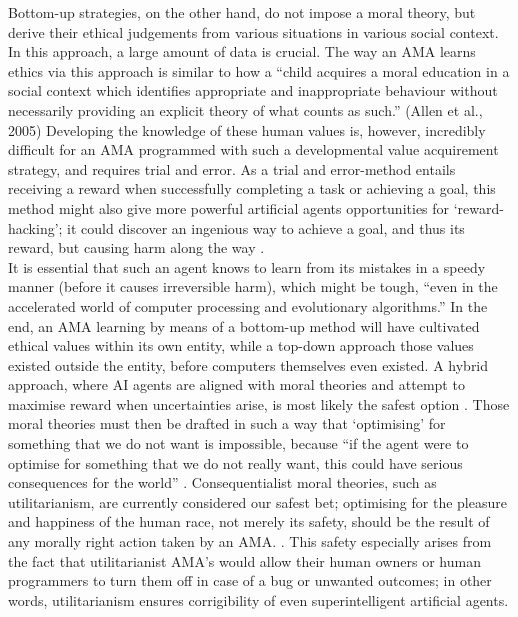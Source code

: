 \documentclass[final]{clv3} %
\begin{document}
Bottom-up strategies, on the other hand, do not impose a moral theory, but derive their ethical judgements from various situations in various social context. In this approach, a large amount of data is crucial. The way an AMA learns ethics via this approach is similar to how a “child acquires a moral education in a social context which identifies appropriate and inappropriate behaviour without necessarily providing an explicit theory of what counts as such.” (Allen et al., 2005) Developing the knowledge of these human values is, however, incredibly difficult for an AMA programmed with such a developmental value acquirement strategy, and requires trial and error. As a trial and error-method entails receiving a reward when successfully completing a task or achieving a goal, this method might also give more powerful artificial agents opportunities for ‘reward-hacking’; it could discover an ingenious way to achieve a goal, and thus its reward, but causing harm along the way \cite{gabriel}. \\

It is essential that such an agent knows to learn from its mistakes in a speedy manner (before it causes irreversible harm), which might be tough, “even in the accelerated world of computer processing and evolutionary algorithms.” In the end, an AMA learning by means of a bottom-up method will have cultivated ethical values within its own entity, while a top-down approach those values existed outside the entity, before computers themselves even existed. A hybrid approach, where AI agents are aligned with moral theories and attempt to maximise reward when uncertainties arise, is most likely the safest option \cite{gabriel}. Those moral theories must then be drafted in such a way that ‘optimising’ for something that we do not want is impossible, because “if the agent were to optimise for something that we do not really want, this could have serious consequences for the world” \cite{bostrom}. Consequentialist moral theories, such as utilitarianism, are currently considered our safest bet; optimising for the pleasure and happiness of the human race, not merely its safety, should be the result of any morally right action taken by an AMA. \cite{gabriel}. This safety especially arises from the fact that utilitarianist AMA’s would allow their human owners or human programmers to turn them off in case of a bug or unwanted outcomes; in other words, utilitarianism ensures corrigibility \cite{soares} of even superintelligent artificial agents.\\
\end{document}
